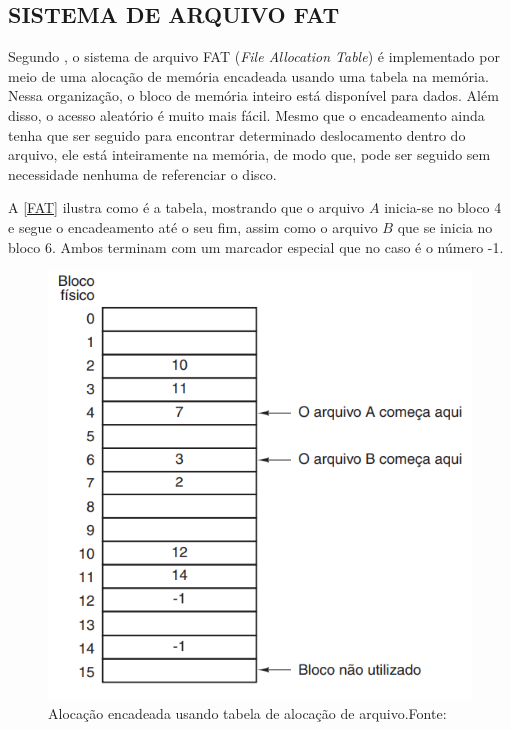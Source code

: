 \subsection{SISTEMA DE ARQUIVO FAT}

Segundo , o sistema de arquivo FAT (\textit{File Allocation Table}) é implementado por meio de uma alocação de memória encadeada usando uma tabela na memória. Nessa organização, o bloco de memória inteiro está disponível para dados. Além disso, o acesso aleatório é muito mais fácil. Mesmo que o encadeamento ainda tenha que ser seguido para encontrar determinado deslocamento dentro do arquivo, ele está inteiramente na memória, de modo que, pode ser seguido sem necessidade nenhuma de referenciar o disco.

A \autoref{FAT} ilustra como é a tabela, mostrando que o arquivo $A$ inicia-se no bloco 4 e segue o encadeamento até o seu fim, assim como o arquivo $B$ que se inicia no bloco 6. Ambos terminam com um marcador especial que no caso é o número -1.

\begin{figure}[H]
    \scriptsize
     \centering
     \includegraphics[scale=0.7]{dados/figuras/FAT.png}
     \caption{Alocação encadeada usando tabela de alocação de arquivo.\newline  Fonte:\cite{tanenbaumSO}}
     \label{FAT}
\end{figure}

